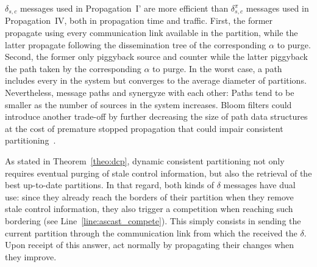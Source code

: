 $\delta_{s, c}$ messages used in Propagation~I' are more efficient
than $\delta_{s, c}^\pi$ messages used in Propagation~IV, both in
propagation time and traffic. First, the former propagate using every
communication link available in the partition, while the latter
propagate following the dissemination tree of the corresponding
$\alpha$ to purge. Second, the former only piggyback source and
counter while the latter piggyback the path taken by the corresponding
$\alpha$ to purge.  In the worst case, a path includes every \process
in the system but converges to the average diameter of
partitions. Nevertheless, message paths and \NAME synergyze with each
other: Paths tend to be smaller as the number of sources in the system
increases. Bloom filters could introduce another trade-off by further
decreasing the size of path data structures at the cost of premature
stopped propagation that could impair consistent
partitioning~\cite{whitaker2002forwarding}.

As stated in Theorem~\ref{theo:dcp}, dynamic consistent partitioning
not only requires eventual purging of stale control information, but
also the retrieval of the best up-to-date partitions. In that regard,
both kinds of $\delta$ messages have dual use: since they already
reach the borders of their partition when they remove stale control
information, they also trigger a competition when reaching such
bordering \processes (see Line~\ref{line:ascast_compete}). This simply
consists in sending the current partition through the communication
link from which the \process received the $\delta$. Upon receipt of
this answer, \processes act normally by propagating their changes when
they improve.

